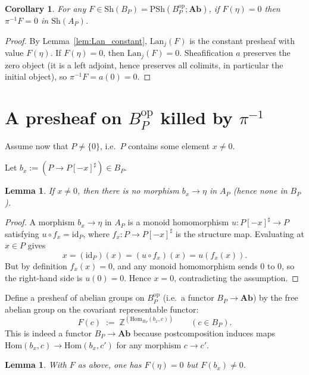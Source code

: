 \documentclass[11pt]{article}
\newtheorem{lemma}[theorem]{Lemma}
\newtheorem{corollary}[theorem]{Corollary}
\theoremstyle{remark}
\begin{document}
\begin{corollary}\label{cor:pi-inv-zero}
For any $F\in \mathrm{Sh}(B_P)=\mathrm{PSh}(B_P^{\mathrm{op}};\mathbf{Ab})$, if $F(\eta)=0$
then $\pi^{-1}F=0$ in $\mathrm{Sh}(A_P)$.
\end{corollary}

\begin{proof}
By Lemma~\ref{lem:Lan_constant}, $\mathrm{Lan}_j(F)$ is the constant presheaf with value
$F(\eta)$. If $F(\eta)=0$, then $\mathrm{Lan}_j(F)=0$.
Sheafification $a$ preserves the zero object (it is a left adjoint, hence preserves all
colimits, in particular the initial object), so $\pi^{-1}F=a(0)=0$.
\end{proof}

\section{A presheaf on $B_P^{\mathrm{op}}$ killed by $\pi^{-1}$}

Assume now that $P\neq \{0\}$, i.e.\ $P$ contains some element $x\neq 0$.

Let $b_x:=(P\to P[-x]^\sharp)\in B_P$.

\begin{lemma}\label{lem:no-map}
If $x\neq 0$, then there is no morphism $b_x\to \eta$ in $A_P$ (hence none in $B_P$).
\end{lemma}

\begin{proof}
A morphism $b_x\to \eta$ in $A_P$ is a monoid homomorphism $u\colon P[-x]^\sharp\to P$
satisfying $u\circ f_x=\mathrm{id}_P$, where $f_x\colon P\to P[-x]^\sharp$ is the structure map.
Evaluating at $x\in P$ gives
\[
x=(\mathrm{id}_P)(x)=(u\circ f_x)(x)=u(f_x(x)).
\]
But by definition $f_x(x)=0$, and any monoid homomorphism sends $0$ to $0$, so the right-hand
side is $u(0)=0$. Hence $x=0$, contradicting the assumption.
\end{proof}

Define a presheaf of abelian groups on $B_P^{\mathrm{op}}$ (i.e.\ a functor $B_P\to\mathbf{Ab}$)
by the free abelian group on the covariant representable functor:
\[
F(c) \;:=\; \mathbb{Z}^{(\mathrm{Hom}_{B_P}(b_x,c))}\qquad (c\in B_P).
\]
This is indeed a functor $B_P\to\mathbf{Ab}$ because postcomposition induces maps
$\mathrm{Hom}(b_x,c)\to \mathrm{Hom}(b_x,c')$ for any morphism $c\to c'$.

\begin{lemma}\label{lem:F-values}
With $F$ as above, one has $F(\eta)=0$ but $F(b_x)\neq 0$.
\end{lemma}
\end{document}
